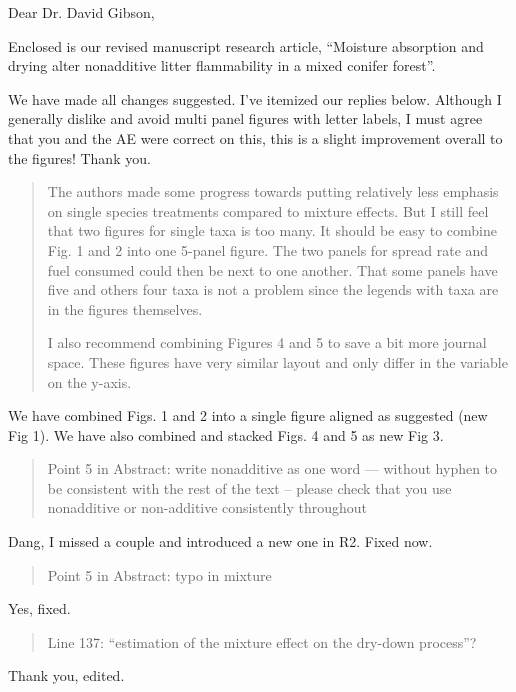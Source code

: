 \documentclass[letterpaper, 12pt]{letter}
\begin{document}
\begin{letter}{}

\opening{Dear Dr. David Gibson,}

Enclosed is our revised manuscript research article, ``Moisture absorption and
drying alter nonadditive litter flammability in a mixed conifer forest''.

We have made all changes suggested. I've itemized our replies below. Although I generally dislike and avoid multi panel figures with letter labels, I must agree that you and the AE were correct on this, this is a slight improvement overall to the figures! Thank you.


\begin{quote}
The authors made some progress towards putting relatively less emphasis on
single species treatments compared to mixture effects. But I still feel that
two figures for single taxa is too many. It should be easy to combine Fig. 1
and 2 into one 5-panel figure. The two panels for spread rate and fuel consumed
could then be next to one another. That some panels have five and others four
taxa is not a problem since the legends with taxa are in the figures
themselves.


I also recommend combining Figures 4 and 5 to save a bit more journal space.
These figures have very similar layout and only differ in the variable on the
y-axis.
\end{quote}

We have combined Figs. 1 and 2 into a single figure aligned as suggested (new Fig 1). We have also combined and stacked Figs. 4 and 5 as new Fig 3.

\begin{quote}
  Point 5 in Abstract: write nonadditive as one word --- without hyphen to be
  consistent with the rest of the text – please check that you use nonadditive or
  non-additive consistently throughout
\end{quote}

Dang, I missed a couple and introduced a new one in R2. Fixed now.

\begin{quote}
Point 5 in Abstract: typo in mixture
\end{quote}

Yes, fixed.
\begin{quote}
  Line 137: ``estimation of the mixture effect on the dry-down process''?
\end{quote}

Thank you, edited.


\end{letter}
\end{document}
